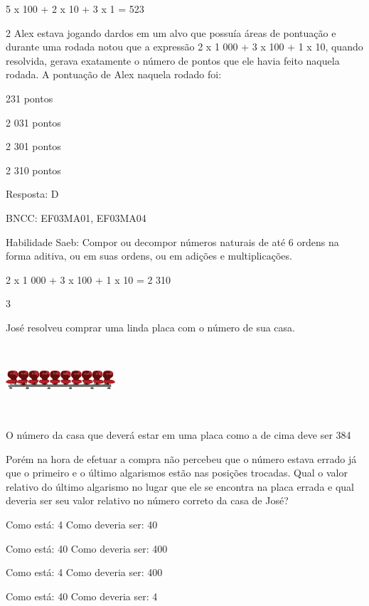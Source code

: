 \begin{escolha}
{\begin{escolha}
{5 x 100 + 2 x 10 + 3 x 1 = 523

\num{2} Alex estava jogando dardos em um alvo que possuía áreas de pontuação e
durante uma rodada notou que a expressão 2 x 1 000 + 3 x 100 + 1 x 10,
quando resolvida, gerava exatamente o número de pontos que ele havia
feito naquela rodada. A pontuação de Alex naquela rodado foi:

\begin{escolha}
\item
  231 pontos
\item
  2 031 pontos
\item
  2 301 pontos
\item
  2 310 pontos
\end{escolha}

Resposta: D

BNCC: EF03MA01, EF03MA04

Habilidade Saeb: Compor ou decompor números naturais de até 6 ordens na
forma aditiva, ou em suas ordens, ou em adições e multiplicações.

2 x 1 000 + 3 x 100 + 1 x 10 = 2 310

\num{3}

José resolveu comprar uma linda placa com o número de sua casa.

\includegraphics[width=1.60256in,height=1.03072in]{media/image107.png}

O número da casa que deverá estar em uma placa como a de cima deve ser
384

Porém na hora de efetuar a compra não percebeu que o número estava
errado já que o primeiro e o último algarismos estão nas posições
trocadas. Qual o valor relativo do último algarismo no lugar que ele se
encontra na placa errada e qual deveria ser seu valor relativo no número
correto da casa de José?

\begin{escolha}
\item
  Como está: 4 Como deveria ser: 40
\item
  Como está: 40 Como deveria ser: 400
\item
  Como está: 4 Como deveria ser: 400
\item
  Como está: 40 Como deveria ser: 4
\end{escolha}

}
\end{escolha}}
\end{escolha}
